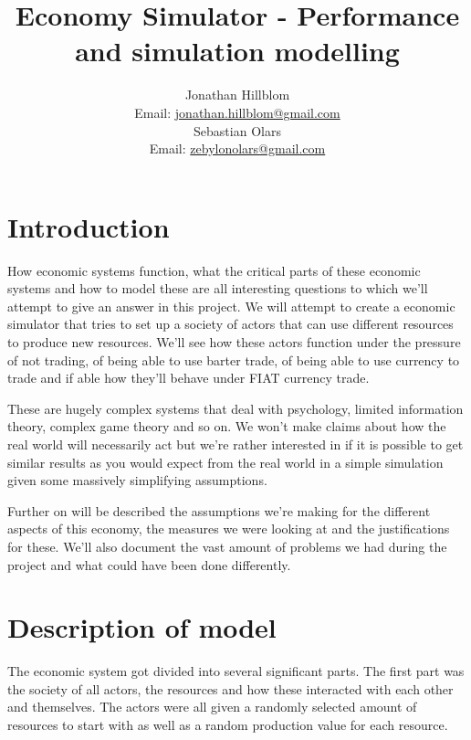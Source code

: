 \documentclass[11p]{article}
\begin{document}
\title{Economy Simulator - Performance and simulation modelling}
\author{Jonathan Hillblom \\ Email: \href{mailto:jonathan.hillblom@gmail.com}{jonathan.hillblom@gmail.com}
\\
Sebastian Olars \\ Email: \href{mailto: zebylonolars@gmail.com}{zebylonolars@gmail.com}}
\maketitle
\section{Introduction}
How economic systems function, what the critical parts of these economic systems and how to model these are all interesting questions to which we'll attempt to give an answer in this project.
We will attempt to create a economic simulator that tries to set up a society of actors that can use different resources to produce new resources. We'll see how these actors function under the pressure of not trading, of being able to use barter trade, of being able to use currency to trade and if able how they'll behave under FIAT currency trade.

These are hugely complex systems that deal with psychology, limited information theory, complex game theory and so on. We won't make claims about how the real world will necessarily act but we're rather interested in if it is possible to get similar results as you would expect from the real world in a simple simulation given some massively simplifying assumptions.

Further on will be described the assumptions we're making for the different aspects of this economy, the measures we were looking at and the justifications for these. We'll also document the vast amount of problems we had during the project and what could have been done differently.
\section{Description of model}
The economic system got divided into several significant parts. The first part was the society of all actors, the resources and how these interacted with each other and themselves. The actors were all given a randomly selected amount of resources to start with as well as a random production value for each resource. 
\end{document}
